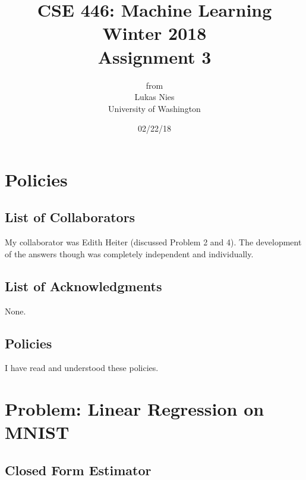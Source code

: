 \documentclass[12pt]{article}
\begin{document}
	
	\title{
		\textbf{\huge{CSE 446: Machine Learning Winter 2018 }} \\[2cm]
		\LARGE{Assignment 3}\\[1cm]
	}
	\author{from \\ Lukas Nies \\ University of Washington}
	\date{02/22/18}
	\clearpage\maketitle\thispagestyle{empty}
	\newpage

	\tableofcontents
	\setcounter{page}{0}
	\newpage
	
	\setcounter{section}{-1}
	

\section{Policies}

\subsection{List of Collaborators}

My collaborator was Edith Heiter (discussed Problem 2 and 4). The development of the answers though was completely independent and individually.

\subsection{List of Acknowledgments}

None.

\subsection{Policies}

I have read and understood these policies.

\newpage

\section{Problem: Linear Regression on MNIST}

\subsection{Closed Form Estimator}
\end{document}
